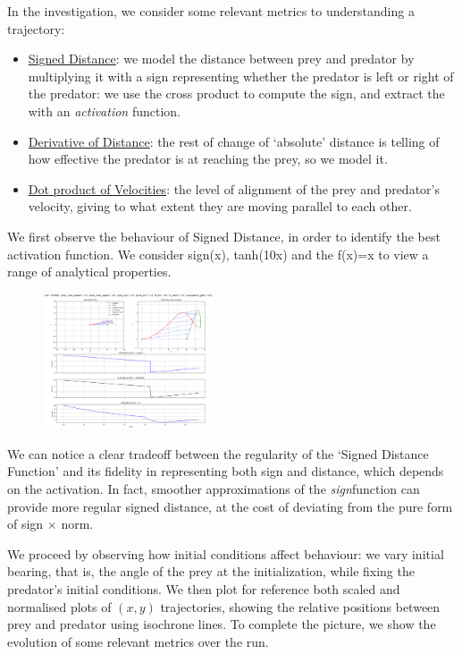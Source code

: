 \documentclass[10pt, twocolumn]{article}
\begin{document}
        In the investigation, we consider some relevant metrics to understanding a trajectory:
        \begin{itemize}
          \item \underline{Signed Distance}: we model the distance between prey and predator by multiplying it with a sign representing whether the predator is left or right of the predator: we use the cross product to compute the sign, and extract the with an \textit{activation} function.
          \item \underline{Derivative of Distance}: the rest of change of `absolute' distance is telling of how effective the predator is at reaching the prey, so we model it.
          \item \underline{Dot product of Velocities}: the level of alignment of the prey and predator's velocity, giving to what extent they are moving parallel to each other.
        \end{itemize}

        We first observe the behaviour of Signed Distance, in order to identify the best activation function. We consider sign(x), tanh(10x) and the f(x)=x to view a range of analytical properties.
        \begin{figure}[H]
          \centering
          \includegraphics[width=0.45\textwidth]{figures/signed_distance.png}
          \label{fig:trajectory}
        \end{figure}

        We can notice a clear tradeoff between the regularity of the `Signed Distance Function' and its fidelity in representing both sign and distance, which depends on the activation. In fact, smoother approximations of the \textit{sign}function can provide more regular signed distance, at the cost of deviating from the pure form of sign $\times$ norm.

        We proceed by observing how initial conditions affect behaviour: we vary initial bearing, that is, the angle of the prey at the initialization, while fixing the predator's initial conditions. We then plot for reference both scaled and normalised plots of $(x,y)$ trajectories, showing the relative positions between prey and predator using isochrone lines. To complete the picture, we show the evolution of some relevant metrics over the run.
\end{document}
